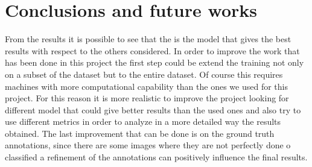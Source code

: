 \documentclass[a4paper,10pt]{report}
\begin{document}
{\let\clearpage\relax\par \chapter{Conclusions and future works}\label{chap:conclusions}

From the results it is possible to see that the  is the model that gives the best results with respect to the others considered. In order to improve the work that has been done in this project the first step could be extend the training not only on a subset of the dataset but to the entire dataset. Of course this requires machines with more computational capability than the ones we used for this project. For this reason it is more realistic to improve the project looking for different model that could give better results than the used ones and also try to use different metrics in order to analyze in a more detailed way the results obtained. The last improvement that can be done is on the ground truth annotations, since there are some images where they are not perfectly done o classified a refinement of the annotations can positively influence the final results.
}


\printbibliography
\end{document}
